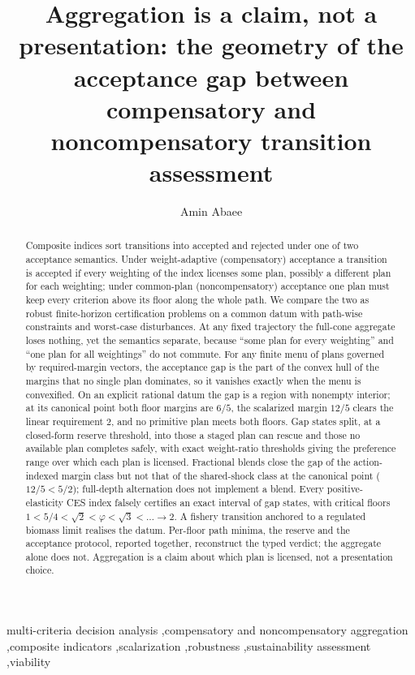 \documentclass[preprint,11pt,authoryear]{elsarticle}
\theoremstyle{definition}
\theoremstyle{remark}
\begin{document}
\begin{frontmatter}

\title{Aggregation is a claim, not a presentation: the geometry of the acceptance gap between compensatory and noncompensatory transition assessment}

\author[1]{Amin Abaee}

\begin{abstract}
Composite indices sort transitions into accepted and rejected under one of two acceptance semantics. Under weight-adaptive (compensatory) acceptance a transition is accepted if every weighting of the index licenses some plan, possibly a different plan for each weighting; under common-plan (noncompensatory) acceptance one plan must keep every criterion above its floor along the whole path. We compare the two as robust finite-horizon certification problems on a common datum with path-wise constraints and worst-case disturbances. At any fixed trajectory the full-cone aggregate loses nothing, yet the semantics separate, because ``some plan for every weighting'' and ``one plan for all weightings'' do not commute. For any finite menu of plans governed by required-margin vectors, the acceptance gap is the part of the convex hull of the margins that no single plan dominates, so it vanishes exactly when the menu is convexified. On an explicit rational datum the gap is a region with nonempty interior; at its canonical point both floor margins are $6/5$, the scalarized margin $12/5$ clears the linear requirement $2$, and no primitive plan meets both floors. Gap states split, at a closed-form reserve threshold, into those a staged plan can rescue and those no available plan completes safely, with exact weight-ratio thresholds giving the preference range over which each plan is licensed. Fractional blends close the gap of the action-indexed margin class but not that of the shared-shock class at the canonical point ($12/5<5/2$); full-depth alternation does not implement a blend. Every positive-elasticity CES index falsely certifies an exact interval of gap states, with critical floors $1<5/4<\sqrt2<\varphi<\sqrt3<\dots\to2$. A fishery transition anchored to a regulated biomass limit realises the datum. Per-floor path minima, the reserve and the acceptance protocol, reported together, reconstruct the typed verdict; the aggregate alone does not. Aggregation is a claim about which plan is licensed, not a presentation choice.
\end{abstract}

\begin{keyword}
multi-criteria decision analysis \sep compensatory and noncompensatory aggregation \sep composite indicators \sep scalarization \sep robustness \sep sustainability assessment \sep viability
\end{keyword}

\end{frontmatter}
\end{document}
